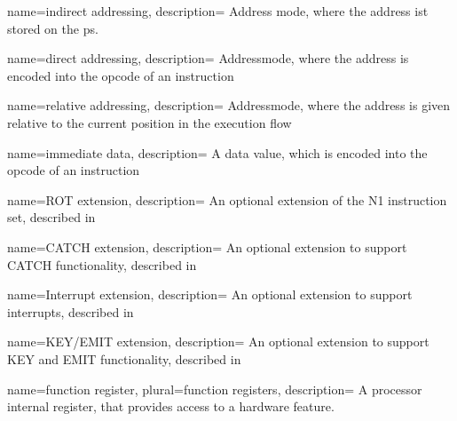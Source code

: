  {
    name={indirect addressing},
    description={
    Address mode, where the address ist stored on the \gls{ps}.
    \nopostdesc
    }
}

 {
    name={direct addressing},
    description={
    Addressmode, where the address is encoded into the \gls{opcode} of
    an instruction
    \nopostdesc
    }
}

 {
    name={relative addressing},
    description={
    Addressmode, where the address is given relative to the current position
    in the execution flow
    \nopostdesc    
    }
}

 {
    name={immediate data},
    description={
    A data value, which is encoded into the \gls{opcode} of an instruction
    \nopostdesc    
    }
}

 {
    name={ROT extension},
    description={
    An optional extension of the N1 instruction set, described in 
    \nopostdesc    
    }
}

 {
    name={CATCH extension},
    description={
    An optional extension to support CATCH functionality, described in 
    \nopostdesc    
    }
}

 {
    name={Interrupt extension},
    description={
    An optional extension to support interrupts, described in 
    \nopostdesc    
    }
}

 {
    name={KEY/EMIT extension},
    description={
    An optional extension to support KEY and EMIT functionality, described in 
    \nopostdesc    
    }
}

 {
    name={function register},
    plural={function registers},
    description={
    A processor internal register, that provides access to a hardware feature.
    \nopostdesc    
    }
}



